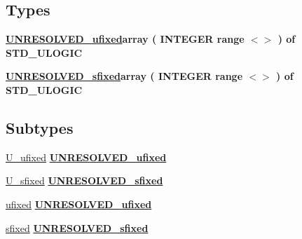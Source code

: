 \subsection*{Types}
 \begin{DoxyCompactItemize}
\item 
{\bfseries \hyperlink{classfixed__pkg_ae78bc2b36d22f6abeac163955e8a587d}{U\+N\+R\+E\+S\+O\+L\+V\+E\+D\+\_\+ufixed}{\bfseries \textcolor{keywordflow}{array}\textcolor{vhdlchar}{ }\textcolor{vhdlchar}{(}\textcolor{vhdlchar}{ }\textcolor{comment}{I\+N\+T\+E\+G\+E\+R}\textcolor{vhdlchar}{ }\textcolor{keywordflow}{range}\textcolor{vhdlchar}{ }\textcolor{vhdlchar}{$<$$>$}\textcolor{vhdlchar}{ }\textcolor{vhdlchar}{)}\textcolor{vhdlchar}{ }\textcolor{vhdlchar}{ }\textcolor{keywordflow}{of}\textcolor{vhdlchar}{ }\textcolor{comment}{S\+T\+D\+\_\+\+U\+L\+O\+G\+I\+C}\textcolor{vhdlchar}{ }}} 
\item 
{\bfseries \hyperlink{classfixed__pkg_aa723b28a027c3c0f9bca02d75e8df4d6}{U\+N\+R\+E\+S\+O\+L\+V\+E\+D\+\_\+sfixed}{\bfseries \textcolor{keywordflow}{array}\textcolor{vhdlchar}{ }\textcolor{vhdlchar}{(}\textcolor{vhdlchar}{ }\textcolor{comment}{I\+N\+T\+E\+G\+E\+R}\textcolor{vhdlchar}{ }\textcolor{keywordflow}{range}\textcolor{vhdlchar}{ }\textcolor{vhdlchar}{$<$$>$}\textcolor{vhdlchar}{ }\textcolor{vhdlchar}{)}\textcolor{vhdlchar}{ }\textcolor{vhdlchar}{ }\textcolor{keywordflow}{of}\textcolor{vhdlchar}{ }\textcolor{comment}{S\+T\+D\+\_\+\+U\+L\+O\+G\+I\+C}\textcolor{vhdlchar}{ }}} 
\end{DoxyCompactItemize}
\subsection*{Subtypes}
 \begin{DoxyCompactItemize}
\item 
\hyperlink{classfixed__pkg_adf035861826c6e6f4511e21b904f553f}{U\+\_\+ufixed} {\bfseries {\bfseries \hyperlink{classfixed__pkg_ae78bc2b36d22f6abeac163955e8a587d}{U\+N\+R\+E\+S\+O\+L\+V\+E\+D\+\_\+ufixed}} \textcolor{vhdlchar}{ }} 
\item 
\hyperlink{classfixed__pkg_a9c2051e860dce0b23561ee440c917fa0}{U\+\_\+sfixed} {\bfseries {\bfseries \hyperlink{classfixed__pkg_aa723b28a027c3c0f9bca02d75e8df4d6}{U\+N\+R\+E\+S\+O\+L\+V\+E\+D\+\_\+sfixed}} \textcolor{vhdlchar}{ }} 
\item 
\hyperlink{classfixed__pkg_ac19c9d4a114e6044c82c35cc40221922}{ufixed} {\bfseries {\bfseries \hyperlink{classfixed__pkg_ae78bc2b36d22f6abeac163955e8a587d}{U\+N\+R\+E\+S\+O\+L\+V\+E\+D\+\_\+ufixed}} \textcolor{vhdlchar}{ }} 
\item 
\hyperlink{classfixed__pkg_a31c0ff6a2cca69b7f3b2475ca0f71e0c}{sfixed} {\bfseries {\bfseries \hyperlink{classfixed__pkg_aa723b28a027c3c0f9bca02d75e8df4d6}{U\+N\+R\+E\+S\+O\+L\+V\+E\+D\+\_\+sfixed}} \textcolor{vhdlchar}{ }} 
\end{DoxyCompactItemize}
